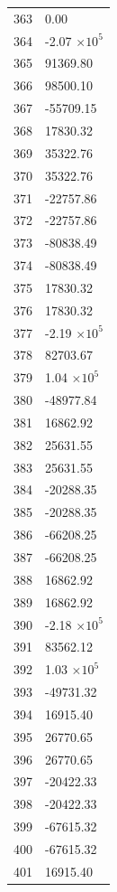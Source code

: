 \documentclass[a4paper,11pt]{article}
\begin{document}
\begin{center}
\begin{longtable}{|R{1.5cm}|R{2.5cm}|}
  363 &         0.00 \\
  364 &        -2.07 $\times 10^{           5}$ \\
  365 &     91369.80 \\
  366 &     98500.10 \\
  367 &    -55709.15 \\
  368 &     17830.32 \\
  369 &     35322.76 \\
  370 &     35322.76 \\
  371 &    -22757.86 \\
  372 &    -22757.86 \\
  373 &    -80838.49 \\
  374 &    -80838.49 \\
  375 &     17830.32 \\
  376 &     17830.32 \\
 {\color{red} 377} & {\color{red}       -2.19 $\times 10^{           5}$}\\
  378 &     82703.67 \\
  379 &         1.04 $\times 10^{           5}$ \\
  380 &    -48977.84 \\
  381 &     16862.92 \\
  382 &     25631.55 \\
  383 &     25631.55 \\
  384 &    -20288.35 \\
  385 &    -20288.35 \\
  386 &    -66208.25 \\
  387 &    -66208.25 \\
  388 &     16862.92 \\
  389 &     16862.92 \\
  390 &        -2.18 $\times 10^{           5}$ \\
  391 &     83562.12 \\
  392 &         1.03 $\times 10^{           5}$ \\
  393 &    -49731.32 \\
  394 &     16915.40 \\
  395 &     26770.65 \\
  396 &     26770.65 \\
  397 &    -20422.33 \\
  398 &    -20422.33 \\
  399 &    -67615.32 \\
  400 &    -67615.32 \\
  401 &     16915.40 \\

\end{longtable}
\end{center}
\end{document}

